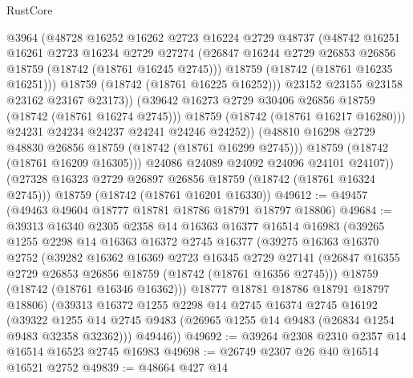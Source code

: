 \begin{lexlean}{RustCore}
\begin{coremodule}
                    @3964
                    (@48728
                      @16252
                      @16262
                      @2723
                      @16224
                      @2729
                      @48737
                      (@48742
                        @16251
                        @16261
                        @2723
                        @16234
                        @2729
                        @27274
                        (@26847 @16244 @2729 @26853 @26856 @18759 (@18742 (@18761 @16245 @2745)))
                        @18759
                        (@18742 (@18761 @16235 @16251)))
                      @18759
                      (@18742 (@18761 @16225 @16252)))
                    @23152
                    @23155
                    @23158
                    @23162
                    @23167
                    @23173))
                (@39642 @16273 @2729 @30406 @26856 @18759 (@18742 (@18761 @16274 @2745)))
                @18759
                (@18742 (@18761 @16217 @16280)))
              @24231
              @24234
              @24237
              @24241
              @24246
              @24252))
          (@48810 @16298 @2729 @48830 @26856 @18759 (@18742 (@18761 @16299 @2745)))
          @18759
          (@18742 (@18761 @16209 @16305)))
        @24086
        @24089
        @24092
        @24096
        @24101
        @24107))
    (@27328 @16323 @2729 @26897 @26856 @18759 (@18742 (@18761 @16324 @2745)))
    @18759
    (@18742 (@18761 @16201 @16330))
@49612 := @49457 (@49463 @49604 @18777 @18781 @18786 @18791 @18797 @18806)
@49684 := @39313
    @16340
    @2305
    @2358
    @14
    @16363
    @16377
    @16514
    @16983
    (@39265
      @1255
      @2298
      @14
      @16363
      @16372
      @2745
      @16377
      (@39275
        @16363
        @16370
        @2752
        (@39282
          @16362
          @16369
          @2723
          @16345
          @2729
          @27141
          (@26847 @16355 @2729 @26853 @26856 @18759 (@18742 (@18761 @16356 @2745)))
          @18759
          (@18742 (@18761 @16346 @16362)))
        @18777
        @18781
        @18786
        @18791
        @18797
        @18806)
      (@39313
        @16372
        @1255
        @2298
        @14
        @2745
        @16374
        @2745
        @16192
        (@39322 @1255 @14 @2745 @9483 (@26965 @1255 @14 @9483 (@26834 @1254 @9483 @32358 @32362)))
        @49446))
@49692 := @39264 @2308 @2310 @2357 @14 @16514 @16523 @2745 @16983
@49698 := @26749 @2307 @26 @40 @16514 @16521 @2752
@49839 := @48664
    @427
    @14

\end{coremodule}
\end{lexlean}
